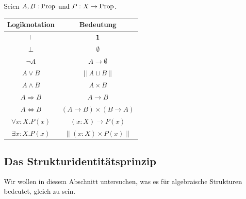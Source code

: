 \begin{definition}
  Seien $A,B:\mathrm{Prop}$ und $P:X\to \mathrm{Prop}$\index{$\top$}\index{$\bot$}\index{$\wedge$}\index{$\vee$}\index{$\Rightarrow$}\index{$\Leftrightarrow$}.
  \begin{center}
    \begin{tabular}{c|c}
      Logiknotation & Bedeutung \\
      \midrule
      $\top$ & $\mathbf{1}$ \\
      $\bot$ & $\emptyset$ \\
      $\neg A$ & $A\to \emptyset$ \\
      $A\vee B$ & $\|A\sqcup B\|$ \\
      $A\wedge B$ & $A\times B$ \\
      $A\Rightarrow B$ & $A\to B$ \\
      $A\Leftrightarrow B$ & $(A\to B)\times (B\to A)$ \\
      $\forall x:X.P(x)$ & $(x:X)\to P(x)$ \\
      $\exists x:X.P(x)$ & $\|(x:X)\times P(x)\|$
    \end{tabular}
  \end{center}
\end{definition}

\subsection{Das Strukturidentitätsprinzip}
Wir wollen in diesem Abschnitt untersuchen, was es für algebraische Strukturen bedeutet, gleich zu sein.

